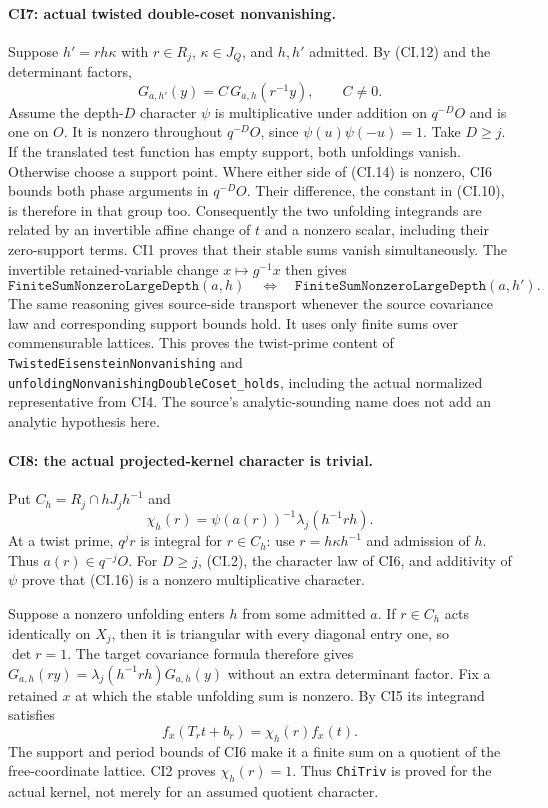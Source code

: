 \paragraph{CI7: actual twisted double-coset nonvanishing.}
Suppose $h'=r h\kappa$ with $r\in R_j$, $\kappa\in J_Q$, and
$h,h'$ admitted. By (CI.12) and the determinant factors,
\[
 G_{a,h'}(y)=C\,G_{a,h}(r^{-1}y),\qquad C\ne0.
 \tag{CI.14}
\]
Assume the depth-$D$ character $\psi$ is multiplicative under
addition on $q^{-D}O$ and is one on $O$. It is nonzero throughout
$q^{-D}O$, since $\psi(u)\psi(-u)=1$. Take $D\ge j$.
If the translated test function has empty support, both
unfoldings vanish. Otherwise choose a support point.
Where either side of (CI.14) is nonzero, CI6 bounds both phase
arguments in $q^{-D}O$. Their difference, the constant in
(CI.10), is therefore in that group too. Consequently the two
unfolding integrands are related by an invertible affine change
of $t$ and a nonzero scalar, including their zero-support terms.
CI1 proves that their stable sums vanish simultaneously. The
invertible retained-variable change $x\mapsto g^{-1}x$ then gives
\[
 \texttt{FiniteSumNonzeroLargeDepth}(a,h)
 \quad\Longleftrightarrow\quad
 \texttt{FiniteSumNonzeroLargeDepth}(a,h').
 \tag{CI.15}
\]
The same reasoning gives source-side transport whenever the
source covariance law and corresponding support bounds hold.
It uses only finite sums over commensurable lattices. This proves
the twist-prime content of \texttt{TwistedEisensteinNonvanishing}
and \texttt{unfoldingNonvanishingDoubleCoset\_holds}, including
the actual normalized representative from CI4. The source's
analytic-sounding name does not add an analytic hypothesis here.

\paragraph{CI8: the actual projected-kernel character is trivial.}
Put $C_h=R_j\cap hJ_jh^{-1}$ and
\[
 \chi_h(r)=\psi(a(r))^{-1}\lambda_j(h^{-1}rh).
 \tag{CI.16}
\]
At a twist prime, $q^j r$ is integral for $r\in C_h$: use
$r=h\kappa h^{-1}$ and admission of $h$. Thus $a(r)\in q^{-j}O$.
For $D\ge j$, (CI.2), the character law of CI6, and additivity
of $\psi$ prove that (CI.16) is a nonzero multiplicative character.

Suppose a nonzero unfolding enters $h$ from some admitted $a$.
If $r\in C_h$ acts identically on $X_j$, then it is triangular
with every diagonal entry one, so $\det r=1$. The target
covariance formula therefore gives
$G_{a,h}(r y)=\lambda_j(h^{-1}rh)G_{a,h}(y)$ without an extra
determinant factor. Fix a retained $x$ at which the stable
unfolding sum is nonzero. By CI5 its integrand satisfies
\[
 f_x(T_rt+b_r)=\chi_h(r)f_x(t).
 \tag{CI.17}
\]
The support and period bounds of CI6 make it a finite sum on a
quotient of the free-coordinate lattice. CI2 proves
$\chi_h(r)=1$. Thus \texttt{ChiTriv} is proved for the actual
kernel, not merely for an assumed quotient character.


